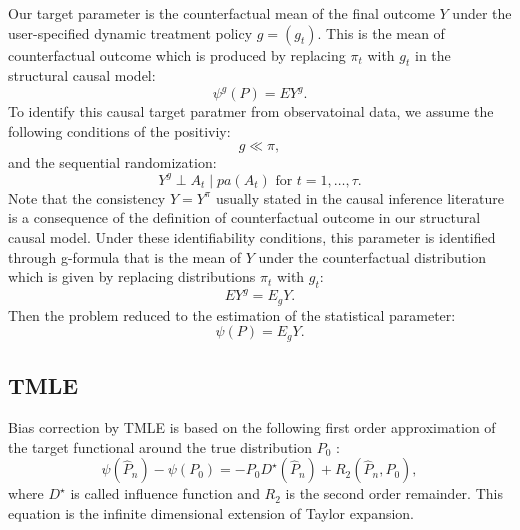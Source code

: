 \documentclass{article}
\theoremstyle{plain}
\theoremstyle{definition}
\theoremstyle{remark}
\begin{document}
Our target parameter is the counterfactual mean of the final outcome $Y$ under the user-specified dynamic treatment policy $g=(g_t)$. This is the mean of counterfactual outcome which is produced by replacing $\pi_t$ with $g_t$ in the structural causal model:
\begin{equation}
    \psi^g(P) = EY^g.
\end{equation}
To identify this causal target paratmer from observatoinal data, we assume the following conditions of the positiviy:
\begin{equation}
    g \ll \pi,    
\end{equation}
and the sequential randomization:
\begin{equation}
    Y^g \perp A_t \mid pa(A_t) \text{ for } t=1,\ldots,\tau.    
\end{equation}
Note that the consistency $Y=Y^{\pi}$ usually stated in the causal inference literature is a consequence of the definition of counterfactual outcome in our structural causal model. Under these identifiability conditions, this parameter is identified through g-formula that is the mean of $Y$ under the counterfactual distribution which is given by replacing distributions $\pi_t$ with $g_t$:
\begin{equation}
    EY^g = E_gY.
\end{equation}
Then the problem reduced to the estimation of the statistical parameter:
\begin{equation}
    \psi(P) = E_gY.
\end{equation}

\subsection{TMLE} \label{TMLE-appendix}
Bias correction by TMLE is based on the following first order approximation of the target functional around the true distribution $P_0$ \cite{laanTMLE2006,laanTLBook2011,kennedySemiparametricDoublyRobust2022}:
\begin{equation}
    \label{eq:von-mises}
    \psi(\hat{P}_n) - \psi(P_0) = -P_0D^\star(\hat{P}_n) + R_2(\hat{P}_n,P_0),
\end{equation}
where $D^\star$ is called influence function and $R_2$ is the second order remainder. This equation is the infinite dimensional extension of Taylor expansion. 
\end{document}
